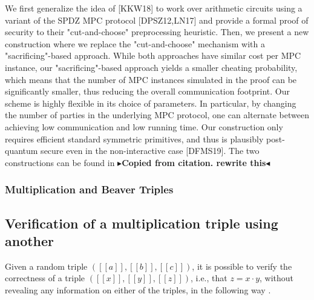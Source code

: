 \documentclass[twoside,11pt,openright]{report}
\theoremstyle{definition}
\theoremstyle{plain}
\newcommand{\todo}[1]{{\color[rgb]{.5,0,0}\textbf{$\blacktriangleright$#1$\blacktriangleleft$}}}
\begin{document}
We first generalize the idea of [KKW18] to work over arithmetic circuits using a variant of the SPDZ MPC protocol [DPSZ12,LN17] and provide a formal proof of security to their "cut-and-choose" preprocessing heuristic. Then, we present a new construction where we replace the "cut-and-choose" mechanism with a "sacrificing"-based approach. While both approaches have similar cost per MPC instance, our "sacrificing"-based approach yields a smaller cheating probability, which means that the number of MPC instances simulated in the proof can be significantly smaller, thus reducing the overall communication footprint. Our scheme is highly flexible in its choice of parameters. In particular, by changing the number of parties in the underlying MPC protocol, one can alternate between achieving low communication and low running time. Our construction only requires efficient standard symmetric primitives, and thus is plausibly post-quantum secure even in the non-interactive case [DFMS19]. The two constructions can be found in \cite{baum2020concretely} \todo{Copied from citation. rewrite this}

\subsubsection{Multiplication and Beaver Triples}
\label{sec:beaver}

\subsection{Verification of a multiplication triple using another}
\label{sec:verify}
Given a random triple $([[a]], [[b]], [[c]])$, it is possible to verify the correctness of a triple $([[x]], [[y]], [[z]])$, i.e., that $z = x \cdot y$, without revealing any information on either of the triples, in the following way \cite{baum2020concretely}.
\end{document}
